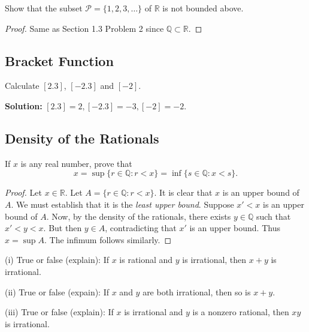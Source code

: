 \begin{tcolorbox}[title=Problem 3, breakable]
    Show that the subset $\mathcal{P} = \{1, 2, 3, \ldots\}$ of $\mathbb{R}$ is not bounded above.
\end{tcolorbox}

\begin{proof}
    Same as Section 1.3 Problem 2 since $\mathbb{Q} \subset \mathbb{R}$.
\end{proof}

\subsection{Bracket Function}

\begin{tcolorbox}[title=Problem 1, breakable]
    Calculate $[2.3]$, $[-2.3]$ and $[-2]$.
\end{tcolorbox}

\textbf{Solution: } $[2.3] = 2, [-2.3] = -3, [-2] = -2$.

\subsection{Density of the Rationals}

\begin{tcolorbox}[title=Problem 1, breakable]
    If $x$ is any real number, prove that 
    \[x = \sup\{r \in \mathbb{Q} : r < x\} = \inf \{s \in \mathbb{Q} : x < s\}.\]
\end{tcolorbox} 

\begin{proof}
    Let $x \in \mathbb{R}$.
    Let $A = \{r \in \mathbb{Q} : r < x\}$.
    It is clear that $x$ is an upper bound of $A$.
    We must establish that it is the \emph{least upper bound}.
    Suppose $x' < x$ is an upper bound of $A$.
    Now, by the density of the rationals, there exists $y \in \mathbb{Q}$ such that
        $x' < y < x$.
    But then $y \in A$, contradicting that $x'$ is an upper bound.
    Thus $x = \sup A$.
    The infimum follows similarly.
\end{proof}

\begin{tcolorbox}[title=Problem 2, breakable]
    (i) True or false (explain): If $x$ is rational and $y$ is irrational, then 
    $x + y$ is irrational.

    (ii) True or false (expain): If $x$ and $y$ are both irrational, then so is
    $x + y$.

    (iii) True or false (explain): If $x$ is irrational and $y$ is a nonzero rational,
    then $xy$ is irrational.
\end{tcolorbox}

